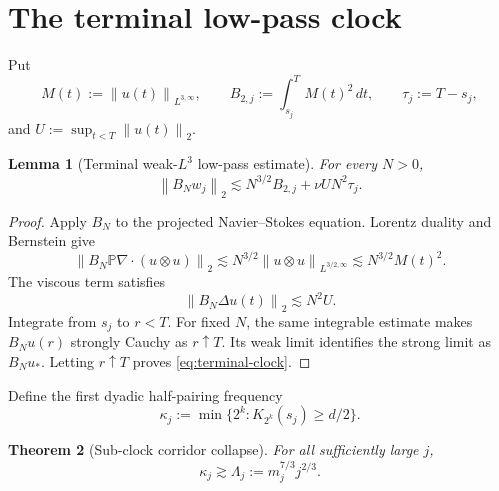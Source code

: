 \documentclass[11pt]{article}
\newtheorem{theorem}{Theorem}
\newtheorem{lemma}[theorem]{Lemma}
\theoremstyle{remark}
\newcommand{\norm}[1]{\left\|#1\right\|}
\begin{document}
\section{The terminal low-pass clock}

Put
\[
 M(t):=\norm{u(t)}_{L^{3,\infty}},\qquad
 B_{2,j}:=\int_{s_j}^TM(t)^2\,dt,\qquad
 \tau_j:=T-s_j,
\]
and \(U:=\sup_{t<T}\norm{u(t)}_2\).

\begin{lemma}[Terminal weak-\(L^3\) low-pass estimate]
\label{lem:terminal-clock}
For every \(N>0\),
\begin{equation}
\label{eq:terminal-clock}
 \norm{B_Nw_j}_2
 \lesssim
 N^{3/2}B_{2,j}
 +\nu U N^2\tau_j.
\end{equation}
\end{lemma}

\begin{proof}
Apply \(B_N\) to the projected Navier--Stokes equation.  Lorentz
duality and Bernstein give
\[
 \norm{B_N\mathbb P\nabla\cdot(u\otimes u)}_2
 \lesssim
 N^{3/2}\norm{u\otimes u}_{L^{3/2,\infty}}
 \lesssim N^{3/2}M(t)^2.
\]
The viscous term satisfies
\[
 \norm{B_N\Delta u(t)}_2\lesssim N^2U.
\]
Integrate from \(s_j\) to \(r<T\).  For fixed \(N\), the same
integrable estimate makes \(B_Nu(r)\) strongly Cauchy as
\(r\uparrow T\).  Its weak limit identifies the strong limit as
\(B_Nu_*\).  Letting \(r\uparrow T\) proves
\eqref{eq:terminal-clock}.
\end{proof}

Define the first dyadic half-pairing frequency
\begin{equation}
\label{eq:kappa}
 \kappa_j
 :=
 \min\{2^k:K_{2^k}(s_j)\geq d/2\}.
\end{equation}

\begin{theorem}[Sub-clock corridor collapse]
\label{thm:corridor-collapse}
For all sufficiently large \(j\),
\begin{equation}
\label{eq:clock-frequency}
 \boxed{
 \kappa_j\gtrsim
 \Lambda_j:=m_j^{7/3}j^{2/3}.
 }
\end{equation}
\end{theorem}
\end{document}
